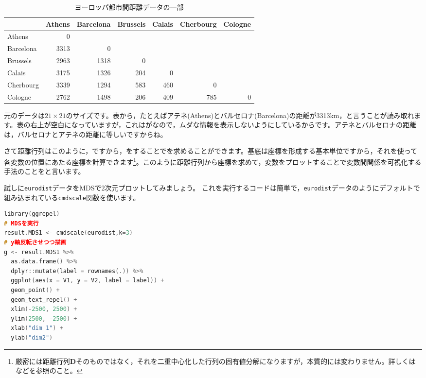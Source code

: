 \documentclass{ltjsbook}
\begin{document}
\begin{table}[ht]
	\centering
	\caption{ヨーロッパ都市間距離データの一部}
	\begin{tabular}{l|rrrrrr}
		          & Athens & Barcelona & Brussels & Calais & Cherbourg & Cologne \\
		\hline
		Athens    & 0      &           &          &        &           &         \\
		Barcelona & 3313   & 0         &          &        &           &         \\
		Brussels  & 2963   & 1318      & 0        &        &           &         \\
		Calais    & 3175   & 1326      & 204      & 0      &           &         \\
		Cherbourg & 3339   & 1294      & 583      & 460    & 0         &         \\
		Cologne   & 2762   & 1498      & 206      & 409    & 785       & 0       \\
		\hline
	\end{tabular}
	\label{tbl::15_01}
\end{table}

元のデータは$21 \times 21$のサイズです。表から，たとえばアテネ(Athens)とバルセロナ(Barcelona)の距離が3313km，と言うことが読み取れます。表の右上が空白になっていますが，これはがなので，ムダな情報を表示しないようにしているからです。アテネとバルセロナの距離は，バルセロナとアテネの距離に等しいですからね。

さて距離行列はこのように，ですから，をすることでを求めることができます。基底は座標を形成する基本単位ですから，それを使って各変数の位置にあたる座標を計算できます\footnote{厳密には距離行列$\bm{D}$そのものではなく，それを二重中心化した行列の固有値分解になりますが，本質的には変わりません。詳しくは\citet{Okada19940115}などを参照のこと。}。このように距離行列から座標を求めて，変数をプロットすることで変数間関係を可視化する手法のことをと言います。

試しに\texttt{eurodist}データをMDSで2次元プロットしてみましょう。
これを実行するコードは簡単で，\texttt{eurodist}データのようにデフォルトで組み込まれている\texttt{cmdscale}関数を使います。

\begin{lstlisting}[language=C++,label={code:x15_01},caption={計量MDSの実践と描画}]
library(ggrepel)
# MDSを実行
result.MDS1 <- cmdscale(eurodist,k=3)
# y軸反転させつつ描画
g <- result.MDS1 %>%
  as.data.frame() %>%
  dplyr::mutate(label = rownames(.)) %>%
  ggplot(aes(x = V1, y = V2, label = label)) +
  geom_point() +
  geom_text_repel() +
  xlim(-2500, 2500) +
  ylim(2500, -2500) +
  xlab("dim 1") +
  ylab("dim2")
\end{lstlisting}
\end{document}
